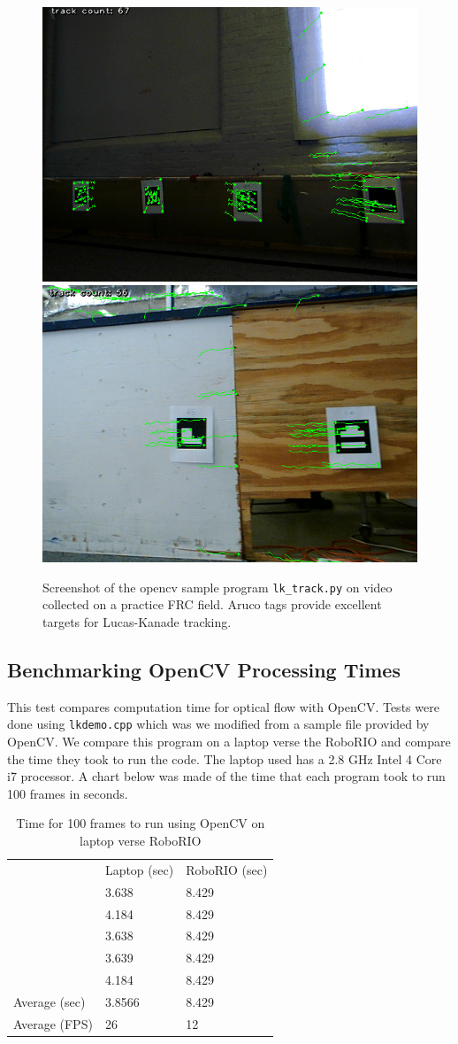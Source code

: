 \documentclass{article}
\begin{document}
    \begin{figure}[H]
      \centering
      \includegraphics[width=0.49\linewidth]{./images/optflow.png}
      \includegraphics[width=0.49\linewidth]{./images/optflow_2.png}
      \caption{Screenshot of the opencv sample program \texttt{lk\_track.py} on video collected on a practice FRC field. Aruco tags provide excellent targets for Lucas-Kanade tracking.}
      \label{fig:opt_flow}
    \end{figure}

  \subsection{Benchmarking OpenCV Processing Times}

    This test compares computation time for optical flow with OpenCV. Tests were done using \texttt{lkdemo.cpp} which was we modified from a sample file provided by OpenCV. We compare this program on a laptop verse the RoboRIO and compare the time they took to run the code. The laptop used has a 2.8 GHz Intel 4 Core i7 processor. A chart below was made of the time that each program took to run 100 frames in seconds.

    \begin{table}[H]
      \centering
      \begin{tabular}{l|l|l|}
        \cline{2-3}
        & Laptop (sec) & RoboRIO (sec) \\
        \cline{2-3}
        & 3.638 & 8.429 \\
        & 4.184 & 8.429\\
        & 3.638 & 8.429 \\
        & 3.639 & 8.429 \\
        & 4.184 & 8.429 \\
        \hline
        \multicolumn{1}{|l|}{Average (sec)} & 3.8566 & 8.429 \\
        \multicolumn{1}{|l|}{Average (FPS)} & 26 & 12 \\
        \hline
      \end{tabular}
      \caption{Time for 100 frames to run using OpenCV on laptop verse RoboRIO}
      \label{table:optical_flow_benchmark}
    \end{table}
\end{document}
